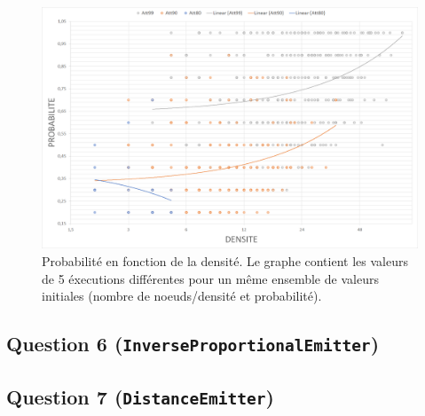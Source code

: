 \documentclass[a4paper]{article}
\begin{document}
\begin{figure}[H]
\begin{minipage}{\textwidth}
  \centering
    \includegraphics[width=\textwidth]{images/ex2q5-log-trendlines.png}
    \caption{Probabilité en fonction de la densité. Le graphe contient
    les valeurs de 5 éxecutions différentes pour un même ensemble de
    valeurs initiales (nombre de noeuds/densité et probabilité).}
\end{minipage}
\end{figure}

\subsection{Question 6 (\texttt{InverseProportionalEmitter})}

\subsection{Question 7 (\texttt{DistanceEmitter})}


\pagebreak
\end{document}
